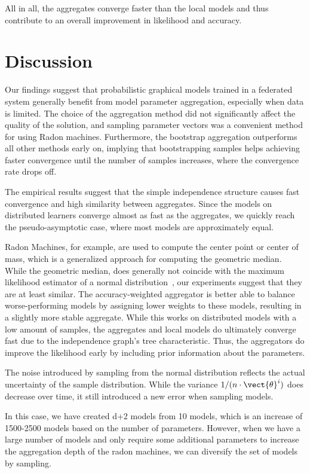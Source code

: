All in all, the aggregates converge faster than the local models and thus contribute to an overall improvement in likelihood and accuracy.


\section{Discussion}
\label{sec:results}

Our findings suggest that probabilistic graphical models trained in a federated system generally benefit from model parameter aggregation, especially when data is limited.
The choice of the aggregation method did not significantly affect the quality of the solution, and sampling parameter vectors was a convenient method for using Radon machines.
Furthermore, the bootstrap aggregation outperforms all other methods early on, implying that bootstrapping samples helps achieving faster convergence until the number of samples increases, where the convergence rate drops off.

The empirical results suggest that the simple independence structure causes fast convergence and high similarity between aggregates.
Since the models on distributed learners converge almost as fast as the aggregates, we quickly reach the pseudo-asymptotic case, where most models are approximately equal. 

Radon Machines, for example, are used to compute the center point or center of mass, which is a generalized approach for computing the geometric median.
While the geometric median, does generally not coincide with the maximum likelihood estimator of a normal distribution~\cite{small1990survey}, our experiments suggest that they are at least similar.
The accuracy-weighted aggregator is better able to balance worse-performing models by assigning lower weights to these models, resulting in a slightly more stable aggregate.
While this works on distributed models with a low amount of samples, the aggregates and local models do ultimately converge fast due to the independence graph's tree characteristic.
Thus, the aggregators do improve the likelihood early by including prior information about the parameters.

The noise introduced by sampling from the normal distribution reflects the actual uncertainty of the sample distribution.
While the variance $1/(n \cdot \vect{\theta}^i)$ does decrease over time, it still introduced a new error when sampling models.

In this case, we have created d+2 models from 10 models, which is an increase of 1500-2500 models based on the number of parameters.
However, when we have a large number of models and only require some additional parameters to increase the aggregation depth of the radon machines, we can diversify the set of models by sampling.


